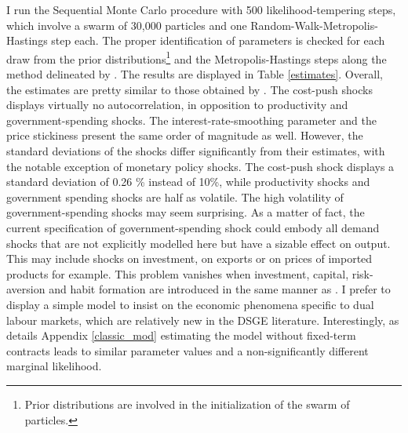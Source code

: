 I run the Sequential Monte Carlo procedure with 500 likelihood-tempering steps, which involve a swarm of 30,000 particles and one Random-Walk-Metropolis-Hastings step each. The proper identification of parameters is checked for each draw from the prior distributions\footnote{Prior distributions are involved in the initialization of the swarm of particles.} and the Metropolis-Hastings steps along the method delineated by \citet{ISKREV2010189}. The results are displayed in Table \ref{estimates}. Overall, the estimates are pretty similar to those obtained by \citet{thomas2009labor}. The cost-push shocks displays virtually no autocorrelation, in opposition to productivity and government-spending shocks. The interest-rate-smoothing parameter and the price stickiness present the same order of magnitude as well. However, the standard deviations of the shocks differ significantly from their estimates, with the notable exception of monetary policy shocks. The cost-push shock displays a standard deviation of 0.26 \% instead of 10\%, while productivity shocks and government spending shocks are half as volatile. The high volatility of government-spending shocks may seem surprising. As a matter of fact, the current specification of government-spending shock could embody all demand shocks that are not explicitly modelled here but have a sizable effect on output. This may include shocks on investment, on exports or on prices of imported products for example. This problem vanishes when investment, capital, risk-aversion and habit formation are introduced in the same manner as \citet{doi:10.1111/j.1538-4616.2008.00180.x}. I prefer to display a simple model to insist on the economic phenomena specific to dual labour markets, which are relatively new in the DSGE literature. Interestingly, as details Appendix \ref{classic_mod} estimating the model without fixed-term contracts leads to similar parameter values and a non-significantly different marginal likelihood.